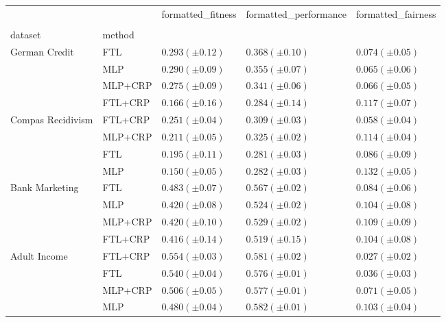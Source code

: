 \begin{tabular}{lllll}
\toprule
 &  & formatted_fitness & formatted_performance & formatted_fairness \\
 &  &  &  &  \\
dataset & method &  &  &  \\
\midrule
\multirow[t]{4}{*}{German Credit} & FTL & $0.293 (\pm0.12)$ & $0.368 (\pm0.10)$ & $0.074 (\pm0.05)$ \\
 & MLP & $0.290 (\pm0.09)$ & $0.355 (\pm0.07)$ & $0.065 (\pm0.06)$ \\
 & MLP+CRP & $0.275 (\pm0.09)$ & $0.341 (\pm0.06)$ & $0.066 (\pm0.05)$ \\
 & FTL+CRP & $0.166 (\pm0.16)$ & $0.284 (\pm0.14)$ & $0.117 (\pm0.07)$ \\
\cline{1-5}
\multirow[t]{4}{*}{Compas Recidivism} & FTL+CRP & $0.251 (\pm0.04)$ & $0.309 (\pm0.03)$ & $0.058 (\pm0.04)$ \\
 & MLP+CRP & $0.211 (\pm0.05)$ & $0.325 (\pm0.02)$ & $0.114 (\pm0.04)$ \\
 & FTL & $0.195 (\pm0.11)$ & $0.281 (\pm0.03)$ & $0.086 (\pm0.09)$ \\
 & MLP & $0.150 (\pm0.05)$ & $0.282 (\pm0.03)$ & $0.132 (\pm0.05)$ \\
\cline{1-5}
\multirow[t]{4}{*}{Bank Marketing} & FTL & $0.483 (\pm0.07)$ & $0.567 (\pm0.02)$ & $0.084 (\pm0.06)$ \\
 & MLP & $0.420 (\pm0.08)$ & $0.524 (\pm0.02)$ & $0.104 (\pm0.08)$ \\
 & MLP+CRP & $0.420 (\pm0.10)$ & $0.529 (\pm0.02)$ & $0.109 (\pm0.09)$ \\
 & FTL+CRP & $0.416 (\pm0.14)$ & $0.519 (\pm0.15)$ & $0.104 (\pm0.08)$ \\
\cline{1-5}
\multirow[t]{4}{*}{Adult Income} & FTL+CRP & $0.554 (\pm0.03)$ & $0.581 (\pm0.02)$ & $0.027 (\pm0.02)$ \\
 & FTL & $0.540 (\pm0.04)$ & $0.576 (\pm0.01)$ & $0.036 (\pm0.03)$ \\
 & MLP+CRP & $0.506 (\pm0.05)$ & $0.577 (\pm0.01)$ & $0.071 (\pm0.05)$ \\
 & MLP & $0.480 (\pm0.04)$ & $0.582 (\pm0.01)$ & $0.103 (\pm0.04)$ \\
\cline{1-5}
\bottomrule
\end{tabular}
